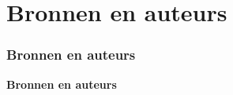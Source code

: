 %

\section{Bronnen en auteurs}
\begin{frame}[fragile]
	\frametitle{Bronnen en auteurs}

	\begin{center}\huge{\color{typo3darkgrey}\textbf{Bronnen en auteurs}}\end{center}

\end{frame}


